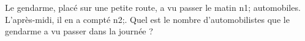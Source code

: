\documentclass[exercice]{thedocument}%
\begin{document}
%
Le gendarme, placé sur une petite route, a vu passer le matin \<n1; automobiles.
L'après-midi, il en a compté \<n2;.\vskip10pt\noindent
Quel est le nombre d'automobilistes que le gendarme a vu passer dans la journée ?
\end{document}
